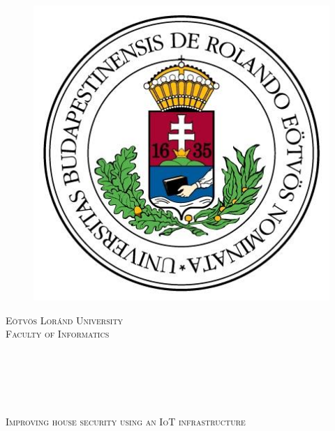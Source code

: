 \documentclass[a4paper,11pt]{report} %
\theoremstyle{change}
\theoremstyle{theoremstyle}
\def\mytitle{Improving house security using an IoT infrastructure} %
\begin{document}

\begin{titlepage}
\thispagestyle{empty}

\textcolor{white}{}
\begin{figure}
\vspace*{-30pt}
\includegraphics*[scale=0.25]{elte-logo.jpg}
\end{figure}
\vspace*{-30pt}
\begin{flushright}
{\fontsize{17.28}{20}
\scshape Eötvös Loránd University\\}
{\fontsize{14}{10}
\scshape Faculty of Informatics}
\end{flushright}
\textcolor{white}{
\\
\\
\\
 \\
}
\vspace{2cm}
\begin{center}
{\fontsize{20.74}{20}  \scshape  \mytitle}
\end{center}

\vspace{4cm}

\begin{tabular}{p{9cm}c}


\end{tabular}
\end{titlepage}
\end{document}
